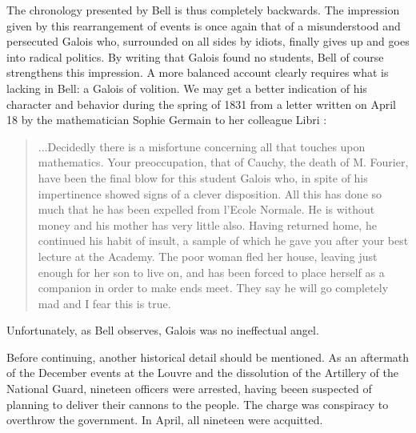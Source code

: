 \documentclass[12pt]{article}
\begin{document}
The chronology presented by Bell is thus completely backwards. The impression given by this rearrangement of events is once again that of a misunderstood and persecuted Galois who, surrounded on all sides by idiots, finally gives up and goes into radical politics. By writing that Galois found no students, Bell of course strengthens this impression. A more balanced account clearly requires what is lacking in Bell: a Galois of volition. We may get a better indication of his character and behavior during the spring of 1831 from a letter written on April 18 by the mathematician Sophie Germain to her colleague Libri \cite{45}:

\begin{quote}
...Decidedly there is a misfortune concerning all that touches upon mathematics. Your preoccupation, that of Cauchy, the death of M. Fourier, have been the final blow for this student Galois who, in spite of his impertinence showed signs of a clever disposition. All this has done so much that he has been expelled from l'Ecole Normale. He is without money and his mother has very little also. Having returned home, he continued his habit of insult, a sample of which he gave you after your best lecture at the Academy. The poor woman fled her house, leaving just enough for her son to live on, and has been forced to place herself as a companion in order to make ends meet. They say he will go completely mad and I fear this is true.
\end{quote}
Unfortunately, as Bell observes, Galois was no ineffectual angel.

Before continuing, another historical detail should be mentioned. As an aftermath of the December events at the Louvre and the dissolution of the Artillery of the National Guard, nineteen officers were arrested, having beeen suspected of planning to deliver their cannons to the people. The charge was conspiracy to overthrow the government. In April, all nineteen were acquitted.
\end{document}
